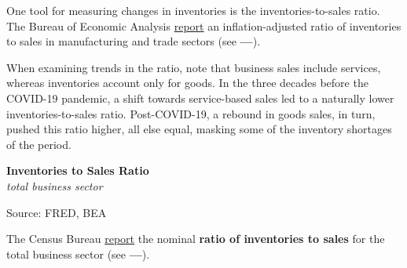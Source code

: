\documentclass{report}
\makeatletter
\newcommand{\tbllink}[1]{\href{https://raw.githubusercontent.com/bdecon/US-chartbook/master/chartbook/data/#1}{\faTable}}
\newcommand*\short[1]{\expandafter\@gobbletwo\number\numexpr#1\relax}
\newcommand{\shdateaxisticks}{
		date coordinates in=x, axis line style={draw=none},
		xmax={2024-01-31},
		max space between ticks=40,	    
		xtick={{1990-01-01}, {1995-01-01}, {2000-01-01}, 
			{2005-01-01}, {2010-01-01}, {2015-01-01}, {2020-01-01}},
		minor xtick={},
		enlarge y limits={0.06}, enlarge x limits={0.01},
		xticklabel style={align=center, yshift=-2pt}, tick label style={inner sep=0pt},
		}
\newcommand{\stdline}[4]{\addplot[very thick, no markers, color=#1] 
		table [x=#2, y=#3, col sep=comma] {#4};	}
\newcommand{\thinline}[4]{\addplot[no markers, color=#1] 
		table [x=#2, y=#3, col sep=comma] {#4};	}
\newcommand{\rbars}{
		\fill[color=black!10] (axis cs:{1990-07-01},\pgfkeysvalueof{/pgfplots/ymin})
			rectangle (axis cs:{1991-03-01}, \pgfkeysvalueof{/pgfplots/ymax});
		\fill[color=black!10] (axis cs:{2007-12-01},\pgfkeysvalueof{/pgfplots/ymin})
			rectangle (axis cs:{2009-07-01}, \pgfkeysvalueof{/pgfplots/ymax});
		\fill[color=black!10] (axis cs:{2001-03-01},\pgfkeysvalueof{/pgfplots/ymin})
			rectangle (axis cs:{2001-11-01}, \pgfkeysvalueof{/pgfplots/ymax});
		\fill[color=black!10] (axis cs:{2020-02-01},\pgfkeysvalueof{/pgfplots/ymin})
			rectangle (axis cs:{2020-05-01}, \pgfkeysvalueof{/pgfplots/ymax});}
\makeatother
\begin{document}
{\begin{minipage}{1.0\textwidth}
One tool for measuring changes in inventories is the inventories-to-sales ratio. The Bureau of Economic Analysis \href{https://apps.bea.gov/iTable/index_UD.cfm}{report} an inflation-adjusted ratio of inventories to sales in manufacturing and trade sectors (see {\color{blue!60!green}\textbf{---}}). 

When examining trends in the ratio, note that business sales include services, whereas inventories account only for goods. In the three decades before the COVID-19 pandemic, a shift towards service-based sales led to a naturally lower inventories-to-sales ratio. Post-COVID-19, a rebound in goods sales, in turn, pushed this ratio higher, all else equal, masking some of the inventory shortages of the period. 
\end{minipage}

\begin{minipage}{0.39\textwidth}
\normalsize \textbf{Inventories to Sales Ratio}\\
\footnotesize{\textit{total business sector}}
\vspace{4.1cm}

\hspace*{3mm} 

\footnotesize{Source: FRED, BEA} \hfill \tbllink{isratio.csv}
\end{minipage} \hspace{6mm}
\begin{minipage}{0.32\textwidth}
\small The Census Bureau \href{https://www.census.gov/mtis/www/data/pdf/mtis_current.pdf}{report} the nominal \textbf{ratio of inventories to sales} for the total business sector (see {\color{blue!40!cyan!80!white}\textbf{---}}). 
\end{minipage}
\newpage 
\hypertarget{buspr}{\label{buspr}}
\begin{minipage}{1.0\textwidth}   

\end{minipage}}
\end{document}
